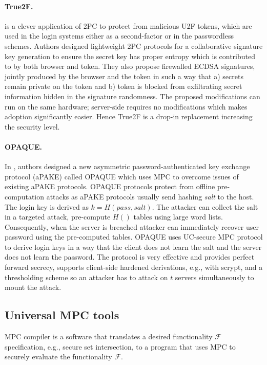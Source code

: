\documentclass[
  digital, %
  twoside, %
  table,   %
  lof,     %
  lot,     %
]{fithesis3}
\theoremstyle{definition}
\theoremstyle{remark}
\begin{document}
\paragraph{True2F.} \cite{DCMBR18} is a clever application of 2PC to protect from malicious U2F tokens, which are used in the login systems either as a second-factor or in the passwordless schemes. 
Authors designed lightweight 2PC protocols for a collaborative signature key generation to ensure the secret key has proper entropy which is contributed to by both browser and token. They also propose firewalled ECDSA signatures, jointly produced by the browser and the token in such a way that a) secrets remain private on the token and b) token is blocked from exfiltrating secret information hidden in the signature randomness.
The proposed modifications can run on the same hardware; server-side requires no modifications which makes adoption significantly easier. Hence True2F is a drop-in replacement increasing the security level.
    
\paragraph{OPAQUE.} In \cite{JKX18}, authors designed a new asymmetric password-authenticated key exchange protocol (aPAKE) called OPAQUE which uses MPC to overcome issues of existing aPAKE protocols.
OPAQUE protocols protect from offline pre-computation attacks as aPAKE protocols usually send hashing \emph{salt} to the host. 
The login key is derived as $k=H(pass, salt)$. The attacker can collect the salt in a targeted attack, pre-compute $H()$ tables using large word lists. Consequently, when the server is breached attacker can immediately recover user password using the pre-computed tables. OPAQUE uses UC-secure MPC protocol to derive login keys in a way that the client does not learn the salt and the server does not learn the password. The protocol is very effective and provides perfect forward secrecy, supports client-side hardened derivations, e.g., with scrypt, and a thresholding scheme so an attacker has to attack on $t$ servers simultaneously to mount the attack.

\subsection{Universal MPC tools}
MPC compiler is a software that translates a desired functionality $\mathcal{F}$ specification, e.g., secure set intersection, to a program that uses MPC to securely evaluate the functionality $\mathcal{F}$.
\end{document}

